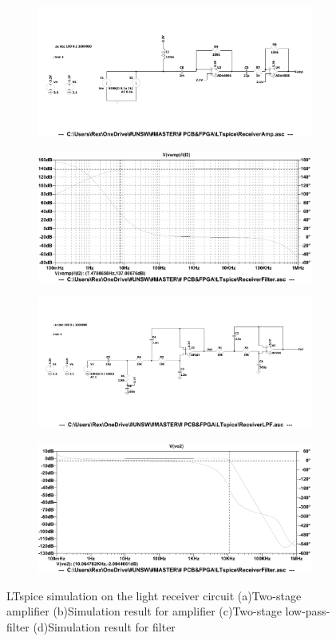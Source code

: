 \begin{figure}
\centering
\begin{subfigure}{1\textwidth}
  \centering
  \includegraphics[width=0.75\linewidth]{4-ANC_Sys/LTspiceAmpSch.pdf}
  \caption{}
  \label{fig_LTspiceAmpSch}
\end{subfigure}
\begin{subfigure}{1\textwidth}
  \centering
  \includegraphics[width=0.75\linewidth]{4-ANC_Sys/LTspiceAmp.pdf}
  \caption{}
  \label{fig_LTspiceAmp}
\end{subfigure}
\begin{subfigure}{1\textwidth}
  \centering
  \includegraphics[width=0.75\linewidth]{4-ANC_Sys/LTspiceLPFSch.pdf}
  \caption{}
  \label{fig_LTspiceLPFSch}
\end{subfigure}
\begin{subfigure}{1\textwidth}
  \centering
  \includegraphics[width=0.75\linewidth]{4-ANC_Sys/LTspiceLPF.pdf}
  \caption{}
  \label{fig_LTspiceLPF}
\end{subfigure}
\caption{LTspice simulation on the light receiver circuit (a)Two-stage amplifier (b)Simulation result for amplifier (c)Two-stage low-pass-filter (d)Simulation result for filter}
\label{fig_LTspice}
\end{figure}


